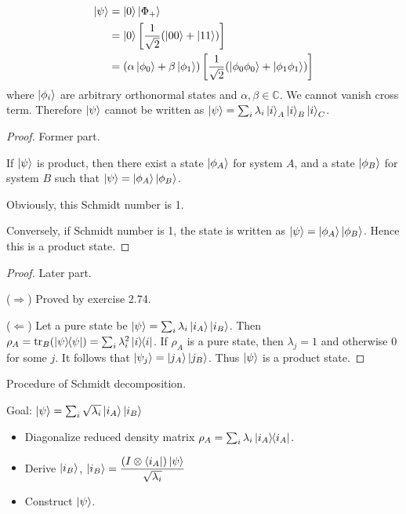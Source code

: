 \begin{align*}
	\ket{\psi}  &=  \ket{0}  \ket{\Phi_+}\\
		&= \ket{0} \left[\frac{1}{\sqrt{2}}(\ket{00} + \ket{11})\right]\\
		&= (\alpha \ket{\phi_0} + \beta \ket{\phi_1})  \left[\frac{1}{\sqrt{2}}(\ket{\phi_0 \phi_0} + \ket{\phi_1 \phi_1})\right]\\
\end{align*}
where $\ket{\phi_i}$ are arbitrary orthonormal states and $\alpha, \beta \in \mathds{C}$.
We cannot vanish cross term. Therefore $\ket{\psi}$ cannot be written as $\ket{\psi} = \sum_i \lambda_i \ket{i}_A \ket{i}_B \ket{i}_C$.


\begin{proof}
	Former part.

	If $\ket{\psi}$ is product, then there exist a state $\ket{\phi_A}$ for system $A$, and a state $\ket{\phi_B}$ for system $B$ such that
	$\ket{\psi} = \ket{\phi_A} \ket{\phi_B}$.

	Obviously, this Schmidt number is  1.

	Conversely, if Schmidt number is 1, the state is written as $\ket{\psi} = \ket{\phi_A} \ket{\phi_B}$.
	Hence this is a product state.
\end{proof}


\begin{proof}
	Later part.

	($\Rightarrow$) Proved by exercise 2.74.

	($\Leftarrow$) Let a pure state be  $\ket{\psi} = \sum_i \lambda_i \ket{i_A} \ket{i_B}$. Then $\rho_A = \operatorname{tr}_B (\ket{\psi}\hspace{-1mm} \bra{\psi}) = \sum_i \lambda_i^2 \ket{i}\hspace{-1mm} \bra{i}$.
	If $\rho_A$ is a pure state, then $\lambda_j = 1$ and otherwise 0 for some $j$.
	It follows that  $\ket{\psi_j} = \ket{j_A} \ket{j_B}$. Thus $\ket{\psi}$ is a product state.
\end{proof}


\begin{screen}
	Procedure of Schmidt decomposition.

	Goal: $\ket{\psi} = \sum_{i} \sqrt{\lambda_i} \ket{i_A} \ket{i_B}$

	\begin{itemize}
		\item Diagonalize reduced density matrix $\rho_A = \sum_i \lambda_i \ket{i_A}\hspace{-1mm} \bra{i_A}$.
		\item Derive $\ket{i_B}$, $\displaystyle  \ket{i_B} = \frac{(I \otimes \bra{i_A}) \ket{\psi}}{\sqrt{\lambda_i}}$
		\item Construct $\ket{\psi}$.
	\end{itemize}

\end{screen}


